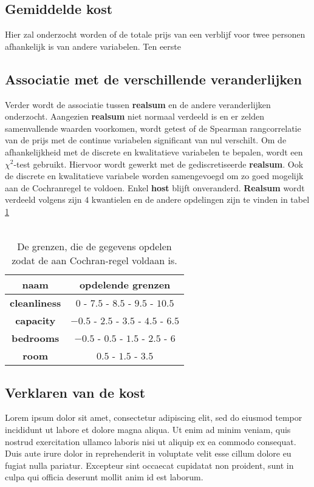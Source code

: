 \documentclass[a4paper]{kulakarticle}
\begin{document}
	\subsection{Gemiddelde kost}
	
	Hier zal onderzocht worden of de totale prijs van een verblijf voor twee personen afhankelijk is van andere variabelen. Ten eerste 
	

	\subsection{Associatie met de verschillende veranderlijken}
	Verder wordt de associatie tussen \textbf{realsum} en de andere veranderlijken onderzocht. Aangezien \textbf{realsum} niet normaal verdeeld is en er zelden samenvallende waarden voorkomen, wordt getest of de Spearman rangcorrelatie van de prijs met de continue variabelen significant van nul verschilt. Om de afhankelijkheid met de discrete en kwalitatieve variabelen te bepalen, wordt een $\chi ^2$-test gebruikt. Hiervoor wordt gewerkt met de gediscretiseerde \textbf{realsum}. Ook de discrete en kwalitatieve variabele worden samengevoegd om zo goed mogelijk aan de Cochranregel te voldoen. Enkel \textbf{host} blijft onveranderd. \textbf{Realsum} wordt verdeeld volgens zijn $4$ kwantielen en de andere opdelingen zijn te vinden in tabel \ref{grenzen}\\\\
	\begin{table}[h]
		\centering
			\begin{tabular}{c|c}
			\centering
			naam& opdelende grenzen\\
			\hline
			\textbf{cleanliness} & $ 0 $ - $ 7.5 $ - $ 8.5$ - $ 9.5 $ - $ 10.5$ \\
			\textbf{capacity}& $-0.5$ - $2.5$ - $3.5$ - $4.5$ - $6.5$\\
			\textbf{bedrooms}& $-0.5$ - $0.5$ - $1.5$ - $2.5$ - $6$\\
			\textbf{room} & $0.5$ - $1.5$ - $3.5$\\
			\end{tabular}
			\caption{De grenzen, die de gegevens opdelen zodat de aan Cochran-regel voldaan is.}
			\label{grenzen}
	\end{table}
	\subsection{Verklaren van de kost}
	Lorem ipsum dolor sit amet, consectetur adipiscing elit, sed do eiusmod tempor incididunt ut labore et dolore magna aliqua. Ut enim ad minim veniam, quis nostrud exercitation ullamco laboris nisi ut aliquip ex ea commodo consequat. Duis aute irure dolor in reprehenderit in voluptate velit esse cillum dolore eu fugiat nulla pariatur. Excepteur sint occaecat cupidatat non proident, sunt in culpa qui officia deserunt mollit anim id est laborum.
	
\end{document}
